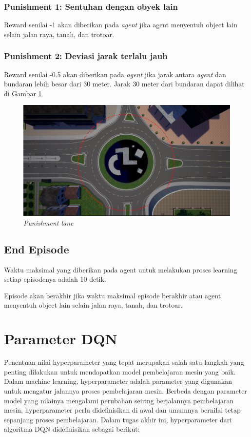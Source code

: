 \subsubsection{Punishment 1: Sentuhan dengan obyek lain}
Reward senilai -1 akan diberikan pada \textit{agent} jika agent menyentuh object lain selain jalan raya, tanah, dan trotoar.

\subsubsection{Punishment 2: Deviasi jarak terlalu jauh}
Reward senilai -0.5 akan diberikan pada \textit{agent} jika jarak antara \textit{agent} dan bundaran lebih besar dari 30 meter. Jarak 30 meter dari bundaran dapat dilihat di Gambar \ref{fig:punishment_lane_line}

\begin{figure}[H] 
	\centering
	\includegraphics[width=1\linewidth]{images/punishment_lane_line}
	\caption{\textit{Punishment lane}}
	\label{fig:punishment_lane_line}
\end{figure}

\subsection{End Episode}
\label{sec:end_episode}
Waktu maksimal yang diberikan pada agent untuk melakukan proses learning setiap episodenya adalah 10 detik.

Episode akan berakhir jika waktu maksimal episode berakhir atau agent menyentuh object lain selain jalan raya, tanah, dan trotoar.

\section{Parameter DQN}
\label{sec:parameter_dqn}
Penentuan nilai hyperparameter yang tepat merupakan salah satu langkah yang penting dilakukan untuk mendapatkan model pembelajaran mesin yang baik. Dalam machine learning, hyperparameter adalah parameter yang digunakan untuk mengatur jalannya proses pembelajaran mesin. Berbeda dengan parameter model yang nilainya mengalami perubahan seiring berjalannya pembelajaran mesin, hyperparameter perlu didefinisikan di awal dan umumnya bernilai tetap sepanjang proses pembelajaran. Dalam tugas akhir ini, hyperparameter dari algoritma DQN didefinisikan sebagai berikut:

